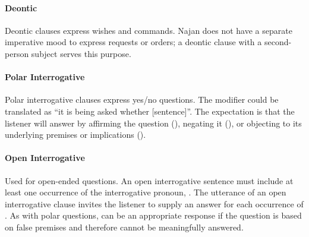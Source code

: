 \paragraph{Deontic} Deontic clauses express wishes and commands. Najan does not
have a separate imperative mood to express requests or orders; a deontic clause
with a second-person subject serves this purpose.

\paragraph{Polar Interrogative} Polar interrogative clauses express yes/no
questions. The modifier  could be translated as ``it is being asked
whether [sentence]''. The expectation is that the listener will answer by
affirming the question (), negating it (), or objecting to
its underlying premises or implications ().


\paragraph{Open Interrogative} Used for open-ended questions. An open
interrogative sentence must include at least one occurrence of the interrogative
pronoun, . The utterance of an open interrogative clause invites the
listener to supply an answer for each occurrence of . As with polar
questions,  can be an appropriate response if the question is based
on false premises and therefore cannot be meaningfully answered.


